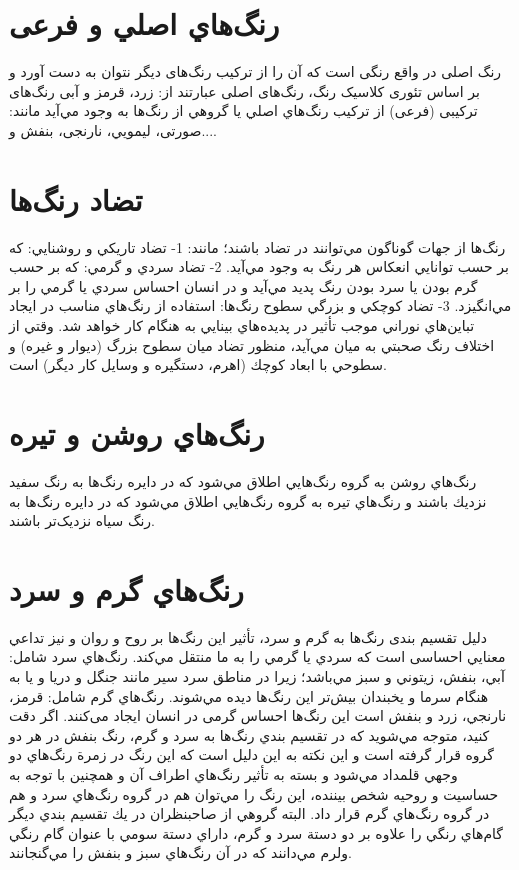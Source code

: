\documentclass[12pt]{report}
\begin{document}
\section{رنگ‌هاي اصلي و فرعی}
رنگ اصلی در واقع رنگی است که آن را از ترکیب رنگ‌های دیگر نتوان به دست آورد و بر اساس تئوری کلاسیک رنگ، رنگ‌های اصلی عبارتند از: زرد، قرمز و آبی 
رنگ‌های ترکیبی (فرعی) از تركيب رنگ‌هاي اصلي يا گروهي از رنگ‌ها به وجود مي‌آيد مانند: صورتی، ليمويي، نارنجی، بنفش و.... 

\section{تضاد رنگ‌ها}
رنگ‌ها از جهات گوناگون مي‌توانند در تضاد باشند؛ مانند:
1- تضاد تاريكي و روشنايي: كه بر حسب توانايي انعكاس هر رنگ به وجود مي‌آيد. 
2- تضاد سردي و گرمي: كه بر حسب گرم بودن يا سرد بودن رنگ پديد مي‌آيد و در انسان احساس سردي يا گرمي را بر مي‌انگيزد.
3- تضاد كوچكي و بزرگي سطوح رنگ‌ها: استفاده از رنگ‌هاي مناسب در ايجاد تباين‌هاي نوراني موجب تأثير در پديده‌هاي بينايي به هنگام كار خواهد شد. 
وقتي از اختلاف رنگ صحبتي به ميان مي‌آيد، منظور تضاد ميان سطوح بزرگ (ديوار و غيره) و سطوحي با ابعاد كوچك (اهرم، دستگيره و وسايل كار ديگر) است. 

\section{رنگ‌هاي روشن و تيره }
رنگ‌هاي روشن به گروه رنگ‌هايي اطلاق مي‌شود كه در دايره رنگ‌ها به رنگ سفيد نزديك باشند و رنگ‌هاي تيره به گروه رنگ‌هايي اطلاق مي‌شود كه در دايره رنگ‌ها به رنگ سياه نزدیک‌تر باشند. 

\section{رنگ‌هاي گرم و سرد}
دليل تقسیم بندی رنگ‌ها به گرم و سرد، تأثير اين رنگ‌ها بر روح و روان و نيز تداعي معنايي احساسی است كه سردي یا گرمي را به ما منتقل مي‌كند.
رنگ‌هاي سرد شامل: آبي، بنفش، زيتوني و سبز مي‌باشد؛ زيرا در مناطق سرد سير مانند جنگل و دريا و يا به هنگام سرما و يخبندان بيش‌تر اين رنگ‌ها ديده مي‌شوند.
رنگ‌هاي گرم شامل: قرمز، نارنجي، زرد و بنفش است این رنگ‌ها احساس گرمی در انسان ایجاد می‌کنند. 
اگر دقت كنيد، متوجه مي‌شويد كه در تقسيم بندي رنگ‌ها به سرد و گرم، رنگ بنفش در هر دو گروه قرار گرفته است و اين نكته به اين دليل است كه اين رنگ در زمرة رنگ‌هاي دو وجهي قلمداد مي‌شود و بسته به تأثير رنگ‌هاي اطراف آن و همچنين با توجه به حساسيت و روحيه شخص بيننده، اين رنگ را مي‌توان هم در گروه رنگ‌هاي سرد و هم در گروه رنگ‌هاي گرم قرار داد. 
البته گروهي از صاحبنظران در يك تقسيم بندي ديگر گام‌هاي رنگي را علاوه بر دو دستة سرد و گرم، داراي دستة سومي با عنوان گام رنگي ولرم مي‌دانند كه در آن رنگ‌هاي سبز و بنفش را مي‌گنجانند.
\end{document}
